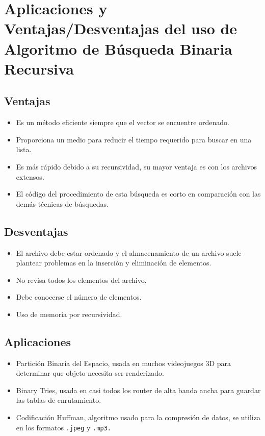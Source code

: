 
\section{Aplicaciones y Ventajas/Desventajas del uso de Algoritmo de Búsqueda Binaria Recursiva}

\subsection{Ventajas}

\begin{itemize}
\item Es un método eficiente siempre que el vector se encuentre ordenado.
\item Proporciona un medio para reducir el tiempo requerido para buscar en una lista.
\item Es más rápido debido a su recursividad, su mayor ventaja es con los archivos extensos.
\item El código del procedimiento de esta búsqueda es corto en comparación con las demás técnicas de búsquedas.
\end{itemize}

\subsection{Desventajas}

\begin{itemize}
\item El archivo debe estar ordenado y el almacenamiento de un archivo suele plantear problemas en la inserción y eliminación de elementos.
\item No revisa todos los elementos del archivo.
\item Debe conocerse el número de elementos.
\item Uso de memoria por recursividad.
\end{itemize}

\subsection{Aplicaciones}

\begin{itemize}
\item Partición Binaria del Espacio, usada en muchos videojuegos 3D para determinar que objeto necesita ser renderizado.
\item Binary Tries, usada en casi todos los router de alta banda ancha para guardar las tablas de enrutamiento.
\item Codificación Huffman, algoritmo usado para la compresión de datos, se utiliza en los formatos \texttt{.jpeg} y \texttt{.mp3.}
\end{itemize}

